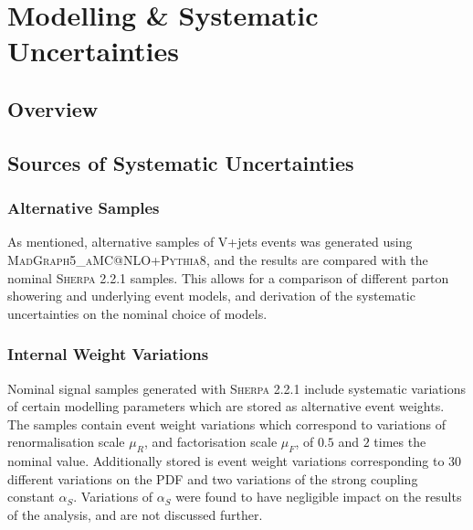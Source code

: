 \section{Modelling \& Systematic Uncertainties}\label{sec:vhbb_modelling}

\subsection{Overview}

\subsection{Sources of Systematic Uncertainties}

%

%
\subsubsection{Alternative Samples}
As mentioned, alternative samples of V+jets events was generated using \textsc{MadGraph5\_aMC@NLO+Pythia8}, and the results are compared with the nominal \textsc{Sherpa 2.2.1} samples. This allows for a comparison of different parton showering and underlying event models, and derivation of the systematic uncertainties on the nominal choice of models.

\subsubsection{Internal Weight Variations}
Nominal signal samples generated with \textsc{Sherpa 2.2.1} include systematic variations of certain modelling parameters which are stored as alternative event weights. The samples contain event weight variations which correspond to variations of renormalisation scale $\mu_R$, and factorisation scale $\mu_F$, of $0.5$ and $2$ times the nominal value. Additionally stored is event weight variations corresponding to $30$ different variations on the PDF and two variations of the strong coupling constant $\alpha_S$. Variations of $\alpha_S$ were found to have negligible impact on the results of the analysis, and are not discussed further. 

